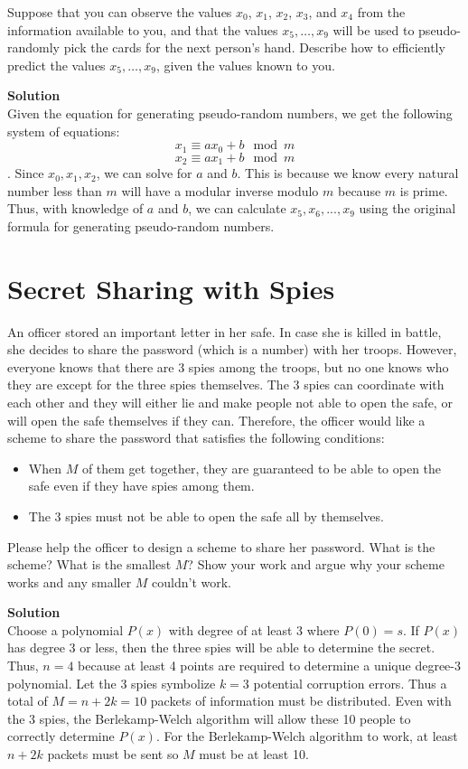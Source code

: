 \documentclass[11pt]{article}
\newcommand*{\Question}[1]{\section{#1}}
\newenvironment{Answer}{\vspace{10pt}\begin{mdframed}\textbf{Solution}\\}{\end{mdframed}\vfill\pagebreak[3]}
\newenvironment{Answer}{\vspace{10pt}}{\vfill\pagebreak[3]}
\begin{document}
Suppose that you can observe the values $x_0$, $x_1$, $x_2$, $x_3$, and $x_4$ from the information available to you, and that the values $x_5,\dots,x_9$ will be used to pseudo-randomly pick the cards for the next person's hand. Describe how to efficiently predict the values $x_5,\dots,x_9$, given the values known to you.
\begin{Answer}
    Given the equation for generating pseudo-random numbers, we get the following system of equations: $$x_1 \equiv ax_0+b \mod m$$ $$x_2 \equiv ax_1+b \mod m$$. Since $x_0, x_1, x_2$, we can solve for $a$ and $b$. This is because we know every natural number less than $m$ will have a modular inverse modulo $m$ because $m$ is prime. Thus, with knowledge of $a$ and $b$, we can calculate $x_5, x_6,...,x_9$ using the original formula for generating pseudo-random numbers.
\end{Answer}


\Question{Secret Sharing with Spies}

An officer stored an important letter in her safe. In case she is
killed in battle, she decides to share the password (which is a number)
with her troops. However, everyone knows that there are 3 spies among
the troops, but no one knows who they are except for the three spies
themselves. The 3 spies can coordinate with each other and they will
either lie and make people not able to open the safe, or will open the
safe themselves if they can. Therefore, the officer would like a
scheme to share the password that satisfies the following conditions:
\begin{itemize}
  \item When $M$ of them get together, they are guaranteed to be
          able to open the safe even if they have spies among them.
  \item The 3 spies must not be able to open the safe all by themselves.
\end{itemize}

Please help the officer to design a scheme to share her password. What
is the scheme? What is the smallest $M$? Show your work and argue why
your scheme works and any smaller $M$ couldn't work.
\begin{Answer}
    Choose a polynomial $P(x)$ with degree of at least 3 where $P(0)=s$. If $P(x)$ has degree 3 or less, then the three spies will be able to determine the secret. Thus, $n=4$ because at least 4 points are required to determine a unique degree-3 polynomial. Let the 3 spies symbolize $k=3$ potential corruption errors. Thus a total of $M=n+2k=10$ packets of information must be distributed. Even with the 3 spies, the Berlekamp-Welch algorithm will allow these 10 people to correctly determine $P(x)$. For the Berlekamp-Welch algorithm to work, at least $n+2k$ packets must be sent so $M$ must be at least 10.
\end{Answer}
\end{document}
